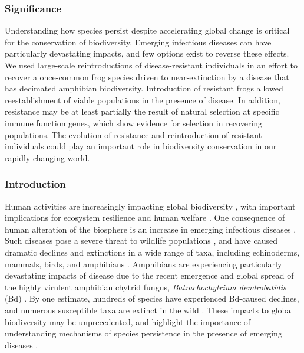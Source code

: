 \documentclass[
  letterpaper,
  DIV=11,
  numbers=noendperiod]{scrartcl}
\begin{document}
\hypertarget{significance}{%
\subsubsection{Significance}\label{significance}}

Understanding how species persist despite accelerating global change is
critical for the conservation of biodiversity. Emerging infectious
diseases can have particularly devastating impacts, and few options
exist to reverse these effects. We used large-scale reintroductions of
disease-resistant individuals in an effort to recover a once-common frog
species driven to near-extinction by a disease that has decimated
amphibian biodiversity. Introduction of resistant frogs allowed
reestablishment of viable populations in the presence of disease. In
addition, resistance may be at least partially the result of natural
selection at specific immune function genes, which show evidence for
selection in recovering populations. The evolution of resistance and
reintroduction of resistant individuals could play an important role in
biodiversity conservation in our rapidly changing world.

\hypertarget{introduction}{%
\subsubsection{Introduction}\label{introduction}}

Human activities are increasingly impacting global biodiversity
\citep{ceballos2015}, with important implications for ecosystem
resilience and human welfare \citep{naeem2009}. One consequence of human
alteration of the biosphere is an increase in emerging infectious
diseases \citep{jones2008, fisher2012}. Such diseases pose a severe
threat to wildlife populations \citep{daszak2000}, and have caused
dramatic declines and extinctions in a wide range of taxa, including
echinoderms, mammals, birds, and amphibians
\citep{hewson2014, samuel2015, scheele2019, cunningham2021}. Amphibians
are experiencing particularly devastating impacts of disease due to the
recent emergence and global spread of the highly virulent amphibian
chytrid fungus, \emph{Batrachochytrium dendrobatidis} (Bd)
\citep{luedtke2023, scheele2019}. By one estimate, hundreds of species
have experienced Bd-caused declines, and numerous susceptible taxa are
extinct in the wild \citep{scheele2019}. These impacts to global
biodiversity may be unprecedented, and highlight the importance of
understanding mechanisms of species persistence in the presence of
emerging diseases \citep{russell2020}.
\end{document}
